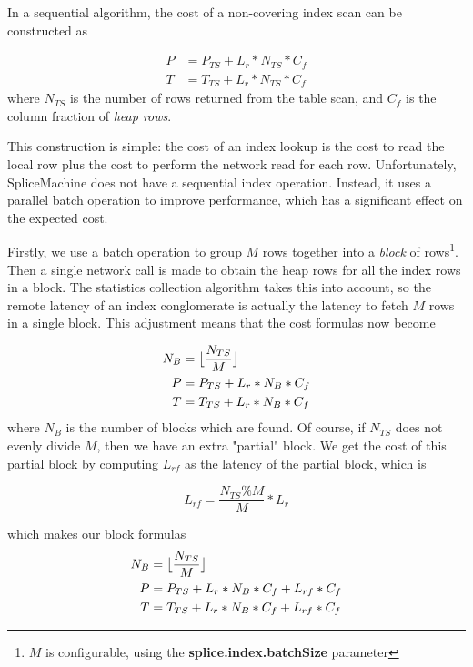 \documentclass[10pt]{amsart}
\DeclarePairedDelimiter{\floor}{\lfloor}{\rfloor}
\begin{document}
In a sequential algorithm, the cost of a non-covering index scan can be constructed as

\begin{equation}
				\begin{aligned}
								P	&= P_{TS}+L_r*N_{TS}*C_f \\
								T &= T_{TS} + L_r*N_{TS}*C_f
				\end{aligned}
\end{equation}
where $N_{TS}$ is the number of rows returned from the table scan, and $C_f$ is the column fraction of \emph{heap rows}. 

This construction is simple: the cost of an index lookup is the cost to read the local row plus the cost to perform the network read for each row. Unfortunately, SpliceMachine does not have a sequential index operation. Instead, it uses a parallel batch operation to improve performance, which has a significant effect on the expected cost.

Firstly, we use a batch operation to group $M$ rows together into a \emph{block} of rows\footnote{$M$ is configurable, using the \textbf{splice.index.batchSize} parameter}. Then a single network call is made to obtain the heap rows for all the index rows in a block. The statistics collection algorithm takes this into account, so the remote latency of an index conglomerate is actually the latency to fetch $M$ rows in a single block. This adjustment means that the cost formulas now become

\begin{equation*}
				\begin{aligned}
								N_B &= \floor[\big]{\frac{N_{TS}}{M}} \\
								P &= P_{TS} + L_r*N_B*C_f \\
								T &= T_{TS} + L_r*N_B*C_f
				\end{aligned}
\end{equation*}
where $N_B$ is the number of blocks which are found. Of course, if $N_{TS}$ does not evenly divide $M$, then we have an extra "partial" block. We get the cost of this partial block by computing $L_{rf}$ as the latency of the partial block, which is

\begin{displaymath}
				L_{rf} = \frac{N_{TS} \% M}{M}*L_r
\end{displaymath}

which makes our block formulas
\begin{equation*}
				\begin{aligned}
								N_B &= \floor[\big]{\frac{N_{TS}}{M}} \\
								P &= P_{TS} + L_r*N_B*C_f +L_{rf}*C_f\\
								T &= T_{TS} + L_r*N_B*C_f +L_{rf}*C_f
				\end{aligned}
\end{equation*}
\end{document}
